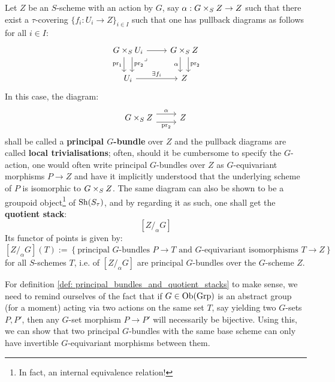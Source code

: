         \begin{definition} \label{def: principal_bundles_and_quotient_stacks}
            Let $Z$ be an $S$-scheme with an action by $G$, say $\alpha: G \x_S Z \to Z$ such that there exist a $\tau$-covering $\{f_i: U_i \to Z\}_{i \in I}$ such that one has pullback diagrams as follows for all $i \in I$:
                $$
                    \begin{tikzcd}
                    {G \x_S U_i} & {G \x_S Z} \\
                    {U_i} & Z
                    \arrow[from=1-1, to=1-2]
                    \arrow["{\pr_1}"', shift right=2, from=1-1, to=2-1]
                    \arrow["{\pr_2}", shift left=2, from=1-1, to=2-1]
                    \arrow["\lrcorner"{anchor=center, pos=0.125}, draw=none, from=1-1, to=2-2]
                    \arrow["{\pr_2}", shift left=2, from=1-2, to=2-2]
                    \arrow["\alpha"', shift right=2, from=1-2, to=2-2]
                    \arrow["{\exists f_i}", from=2-1, to=2-2]
                    \end{tikzcd}
                $$
            In this case, the diagram:
                $$
                    \begin{tikzcd}
                    {G \x_S Z} & Z
                    \arrow["\alpha", shift left=2, from=1-1, to=1-2]
                    \arrow["{\pr_2}"', shift right=2, from=1-1, to=1-2]
                    \end{tikzcd}
                $$
            shall be called a \textbf{principal $G$-bundle} over $Z$ and the pullback diagrams are called \textbf{local trivialisations}; often, should it be cumbersome to specify the $G$-action, one would often write principal $G$-bundles over $Z$ as $G$-equivariant morphisms $P \to Z$ and have it implicitly understood that the underlying scheme of $P$ is isomorphic to $G \x_S Z$. The same diagram can also be shown to be a groupoid object\footnote{In fact, an internal equivalence relation!} of $\mathrm{Sh}(S_{\tau})$, and by regarding it as such, one shall get the \textbf{quotient stack}:
                $$[Z /_{\alpha} G]$$
            Its functor of points is given by:
                $$[Z /_{\alpha} G](T) := \left\{ \text{principal $G$-bundles $P \to T$ and $G$-equivariant isomorphisms $T \to Z$} \right\}$$
            for all $S$-schemes $T$, i.e.  of $[Z/_{\alpha}G]$ are principal $G$-bundles over the $G$-scheme $Z$.
        \end{definition}
        \begin{remark}
            For definition \ref{def: principal_bundles_and_quotient_stacks} to make sense, we need to remind ourselves of the fact that if $G \in \mathrm{Ob}(\mathrm{Grp})$ is an abstract group (for a moment) acting via two actions on the same set $T$, say yielding two $G$-sets $P, P'$, then any $G$-set morphism $P \to P'$ will necessarily be bijective. Using this, we can show that two principal $G$-bundles with the same base scheme can only have invertible $G$-equivariant morphisms between them. 
        \end{remark}
